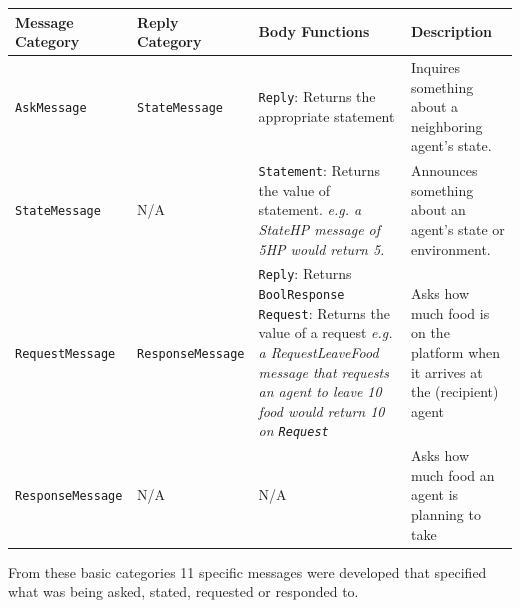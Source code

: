 \begin{center}
\begin{tabular}{p{3cm}p{3cm}p{5cm}p{3.5cm}}
 \hline
 \textbf{Message \newline Category} & \textbf{Reply \newline Category} & \textbf{Body Functions} & \textbf{Description} \\ [0.5ex] 
 \hline\hline
 \texttt{AskMessage} & \texttt{StateMessage} &  \texttt{Reply}: Returns the appropriate statement & Inquires something about a neighboring agent's state. \\
 \hline
 \texttt{StateMessage} & N/A & \texttt{Statement}: Returns the value of statement. \textit{e.g. a StateHP message of 5HP would return 5.} & Announces something about an agent's state or environment. \\ 
 \hline
 \texttt{RequestMessage} & \texttt{ResponseMessage} & \texttt{Reply}: Returns \texttt{BoolResponse} \newline \texttt{Request}: Returns the value of a request \textit{e.g. a RequestLeaveFood message that requests an agent to leave 10 food would return 10 on \texttt{Request}} & Asks how much food is on the platform when it arrives at the (recipient) agent \\ 
 \hline
 \texttt{ResponseMessage} & N/A & N/A & Asks how much food an agent is planning to take \\ 
 \hline
\end{tabular}
\end{center}
From these basic categories 11 specific messages were developed that specified what was being asked, stated, requested or responded to.
